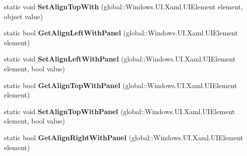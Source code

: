 \begin{DoxyCompactItemize}
\item 
\mbox{\label{class_windows_1_1_u_i_1_1_xaml_1_1_controls_1_1_relative_panel_a6b8a7aa477bd88abf3a2339481e79caa}} 
static void {\bfseries Set\+Align\+Top\+With} (global\+::\+Windows.\+U\+I.\+Xaml.\+U\+I\+Element element, object value)
\item 
\mbox{\label{class_windows_1_1_u_i_1_1_xaml_1_1_controls_1_1_relative_panel_a222a12643fe778467363d2213978054e}} 
static bool {\bfseries Get\+Align\+Left\+With\+Panel} (global\+::\+Windows.\+U\+I.\+Xaml.\+U\+I\+Element element)
\item 
\mbox{\label{class_windows_1_1_u_i_1_1_xaml_1_1_controls_1_1_relative_panel_acf50525353e5484990104e58477683b5}} 
static void {\bfseries Set\+Align\+Left\+With\+Panel} (global\+::\+Windows.\+U\+I.\+Xaml.\+U\+I\+Element element, bool value)
\item 
\mbox{\label{class_windows_1_1_u_i_1_1_xaml_1_1_controls_1_1_relative_panel_a79e2ec081a759fa726ebcde40fc95107}} 
static bool {\bfseries Get\+Align\+Top\+With\+Panel} (global\+::\+Windows.\+U\+I.\+Xaml.\+U\+I\+Element element)
\item 
\mbox{\label{class_windows_1_1_u_i_1_1_xaml_1_1_controls_1_1_relative_panel_a30dbaee90a5c315837eeaf26f417b320}} 
static void {\bfseries Set\+Align\+Top\+With\+Panel} (global\+::\+Windows.\+U\+I.\+Xaml.\+U\+I\+Element element, bool value)
\item 
\mbox{\label{class_windows_1_1_u_i_1_1_xaml_1_1_controls_1_1_relative_panel_ae3766e96075e9f3f5c1aec5f5d7a97cb}} 
static bool {\bfseries Get\+Align\+Right\+With\+Panel} (global\+::\+Windows.\+U\+I.\+Xaml.\+U\+I\+Element element)
\item 
\mbox{\label{class_windows_1_1_u_i_1_1_xaml_1_1_controls_1_1_relative_panel_ad7c025028b52f2ddf66289f89611fc2d}} 

\end{DoxyCompactItemize}
